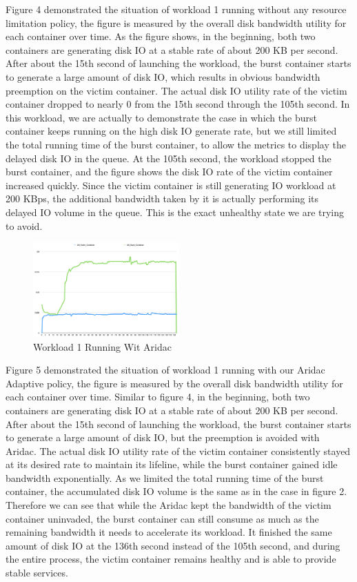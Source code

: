 \documentclass[10pt, conference,compsoc]{IEEEtran}
\begin{document}
Figure 4 demonstrated the situation of workload 1 running without any resource limitation policy, the figure is measured by the overall disk bandwidth utility for each container over time. As the figure shows, in the beginning, both two containers are generating disk IO at a stable rate of about 200 KB per second. After about the 15th second of launching the workload, the burst container starts to generate a large amount of disk IO, which results in obvious bandwidth preemption on the victim container. The actual disk IO utility rate of the victim container dropped to nearly 0 from the 15th second through the 105th second. In this workload, we are actually to demonstrate the case in which the burst container keeps running on the high disk IO generate rate, but we still limited the total running time of the burst container, to allow the metrics to display the delayed disk IO in the queue. At the 105th second, the workload stopped the burst container, and the figure shows the disk IO rate of the victim container increased quickly. Since the victim container is still generating IO workload at 200 KBps, the additional bandwidth taken by it is actually performing its delayed IO volume in the queue. This is the exact unhealthy state we are trying to avoid.\\

\begin{figure}[h]
\centering
\includegraphics[width=0.5\textwidth]{./images/workload1_2.png}
\caption{Workload 1 Running Wit Aridac}
\end{figure}


Figure 5 demonstrated the situation of workload 1 running with our Aridac Adaptive policy, the figure is measured by the overall disk bandwidth utility for each container over time. Similar to figure 4, in the beginning, both two containers are generating disk IO at a stable rate of about 200 KB per second. After about the 15th second of launching the workload, the burst container starts to generate a large amount of disk IO, but the preemption is avoided with Aridac. The actual disk IO utility rate of the victim container consistently stayed at its desired rate to maintain its lifeline, while the burst container gained idle bandwidth exponentially. As we limited the total running time of the burst container, the accumulated disk IO volume is the same as in the case in figure 2.  Therefore we can see that while the Aridac kept the bandwidth of the victim container uninvaded, the burst container can still consume as much as the remaining bandwidth it needs to accelerate its workload. It finished the same amount of disk IO at the 136th second instead of the 105th second, and during the entire process, the victim container remains healthy and is able to provide stable services.\\
\end{document}
